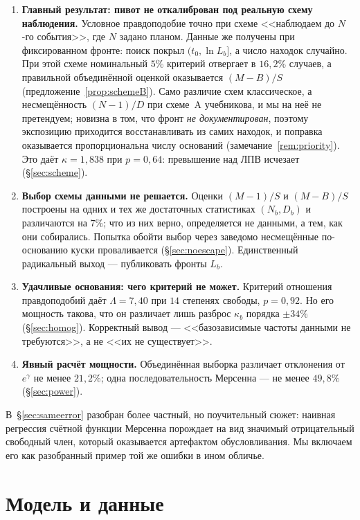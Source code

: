\documentclass[11pt,a4paper]{article}
\theoremstyle{plain}
\theoremstyle{remark}
\newcommand{\eg}{e^{\gamma}}
\begin{document}
\begin{enumerate}
\item\textbf{Главный результат: пивот не откалиброван под реальную схему наблюдения.}
Условное правдоподобие точно при схеме <<наблюдаем до $N$-го события>>, где $N$ задано
планом. Данные же получены при фиксированном фронте: поиск покрыл $(t_0,\ln L_b]$, а число
находок случайно. При этой схеме номинальный $5\%$ критерий отвергает
в $16{,}2\%$ случаев, а правильной объединённой оценкой оказывается $(M-B)/S$
(предложение~\ref{prop:schemeB}). Само различие схем классическое, а несмещённость
$(N-1)/D$ при схеме~A учебникова, и мы на неё не претендуем; новизна в том, что
фронт \emph{не документирован}, поэтому экспозицию приходится восстанавливать
из самих находок, и поправка оказывается пропорциональна числу оснований
(замечание~\ref{rem:priority}). Это даёт $\hat\kappa=1{,}838$ при $p=0{,}64$:
превышение над ЛПВ исчезает (\S\ref{sec:scheme}).

\item\textbf{Выбор схемы данными не решается.} Оценки $(M-1)/S$ и $(M-B)/S$ построены
на одних и тех же достаточных статистиках $(N_b,D_b)$ и различаются на $7\%$;
что из них верно, определяется не данными, а тем, как они собирались. Попытка обойти
выбор через заведомо несмещённые по-основанию куски проваливается
(\S\ref{sec:noescape}). Единственный радикальный выход --- публиковать фронты $L_b$.

\item\textbf{Удачливые основания: чего критерий не может.} Критерий отношения
правдоподобий даёт $\Lambda=7{,}40$ при $14$ степенях свободы, $p=0{,}92$. Но его
мощность такова, что он различает лишь разброс $\kappa_b$ порядка $\pm34\%$
(\S\ref{sec:homog}). Корректный вывод --- <<базозависимые частоты данными не
требуются>>, а не <<их не существует>>.

\item\textbf{Явный расчёт мощности.} Объединённая выборка различает отклонения от
$\eg$ не менее $21{,}2\%$; одна последовательность Мерсенна --- не менее $49{,}8\%$
(\S\ref{sec:power}).
\end{enumerate}

В~\S\ref{sec:sameerror} разобран более частный, но поучительный сюжет: наивная регрессия
счётной функции Мерсенна порождает на вид значимый отрицательный свободный член,
который оказывается артефактом обусловливания. Мы включаем его как разобранный пример
той же ошибки в ином обличье.

\section{Модель и данные}\label{sec:data}
\end{document}
